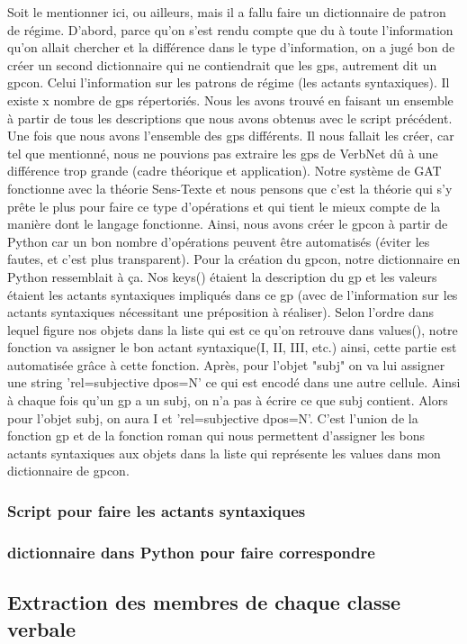 Soit le mentionner ici, ou ailleurs, mais il a fallu faire un dictionnaire de patron de régime. D'abord, parce qu'on s'est rendu compte que du à toute l'information qu'on allait chercher et la différence dans le type d'information, on a jugé bon de créer un second dictionnaire qui ne contiendrait que les gps, autrement dit un gpcon. Celui l'information sur les patrons de régime (les actants syntaxiques). Il existe x nombre de gps répertoriés. Nous les avons trouvé en faisant un ensemble à partir de tous les descriptions que nous avons obtenus avec le script précédent. Une fois que nous avons l'ensemble des gps différents. Il nous fallait les créer, car tel que mentionné, nous ne pouvions pas extraire les gps de VerbNet dû à une différence trop grande (cadre théorique et application). Notre système de GAT fonctionne avec la théorie Sens-Texte et nous pensons que c'est la théorie qui s'y prête le plus pour faire ce type d'opérations et qui tient le mieux compte de la manière dont le langage fonctionne. Ainsi, nous avons créer le gpcon à partir de Python car un bon nombre d'opérations peuvent être automatisés (éviter les fautes, et c'est plus transparent). Pour la création du gpcon, notre dictionnaire en Python ressemblait à ça. Nos keys() étaient la description du gp et les valeurs étaient les actants syntaxiques impliqués dans ce gp (avec de l'information sur les actants syntaxiques nécessitant une préposition à réaliser). Selon l'ordre dans lequel figure nos objets dans la liste qui est ce qu'on retrouve dans values(), notre fonction va assigner le bon actant syntaxique(I, II, III, etc.) ainsi, cette partie est automatisée grâce à cette fonction. Après, pour l'objet "subj" on va lui assigner une string 'rel=subjective dpos=N' ce qui est encodé dans une autre cellule. Ainsi à chaque fois qu'un gp a  un subj, on n'a pas à écrire ce que subj contient. Alors pour l'objet subj, on aura I et 'rel=subjective dpos=N'. C'est l'union de la fonction gp et de la fonction roman qui nous permettent d'assigner les bons actants syntaxiques aux objets dans la liste qui représente les values dans mon dictionnaire de gpcon.
\subsubsection{Script pour faire les actants syntaxiques}
\subsubsection{dictionnaire dans Python pour faire correspondre }
\subsubsection{}

\subsection{Extraction des membres de chaque classe verbale}

\subsubsection{}


